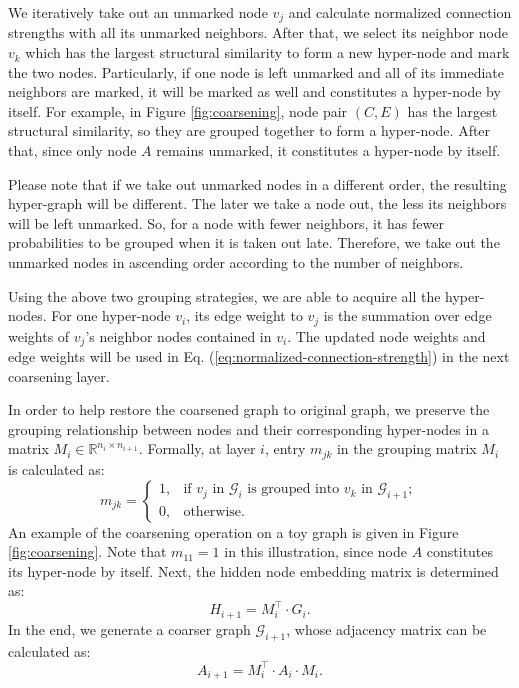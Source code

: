 \documentclass{article}
\begin{document}
We iteratively take out an unmarked node $v_j$ and calculate normalized connection strengths with all its unmarked neighbors. After that, we select its neighbor node $v_k$ which has the largest structural similarity to form a new hyper-node and mark the two nodes. Particularly, if one node is left unmarked and all of its immediate neighbors are marked, it will be marked as well and constitutes a hyper-node by itself. For example, in Figure \ref{fig:coarsening}, node pair $(C, E)$ has the largest structural similarity, so they are grouped together to form a hyper-node. After that, since only node $A$ remains unmarked, it constitutes a hyper-node by itself.

Please note that if we take out unmarked nodes in a different order, the resulting hyper-graph will be different. The later we take a node out, the less its neighbors will be left unmarked. So, for a node with fewer neighbors, it has fewer probabilities to be grouped when it is taken out late. Therefore, we take out the unmarked nodes in ascending order according to the number of neighbors.

Using the above two grouping strategies, we are able to acquire all the hyper-nodes. For one hyper-node $v_i$, its edge weight to $v_j$ is the summation over edge weights of $v_j$'s neighbor nodes contained in $v_i$. The updated node weights and edge weights will be used in Eq. (\ref{eq:normalized-connection-strength}) in the next coarsening layer.

In order to help restore the coarsened graph to original graph, we preserve the grouping relationship between nodes and their corresponding hyper-nodes in a matrix $M_i \in \mathbb{R}^{n_i \times n_{i + 1}}$. Formally, at layer $i$, entry $m_{jk}$ in the grouping matrix $M_i$ is calculated as:
\begin{equation}
	m_{jk} = \left\{
		\begin{array}{ll}
			1, & \mbox{if $v_j$ in $\mathcal{G}_i$ is grouped into $v_k$ in $\mathcal{G}_{i + 1}$};\\
        	0, & \mbox{otherwise}.
        \end{array}
    \right.
    \label{eq:matching-matrix}
\end{equation}
An example of the coarsening operation on a toy graph is given in Figure \ref{fig:coarsening}. Note that $m_{11} = 1$ in this illustration, since node $A$ constitutes its hyper-node by itself. Next, the hidden node embedding matrix is determined as:
\begin{equation}
	H_{i + 1} = M_i^\top \cdot G_i.
	\label{eq:node-representation}
\end{equation}
In the end, we generate a coarser graph $\mathcal{G}_{i+1}$, whose adjacency matrix can be calculated as:
\begin{equation}
	A_{i+1} = M_i^\top \cdot A_{i} \cdot M_i.
	\label{eq:coarsened-graph}
\end{equation}
\end{document}
